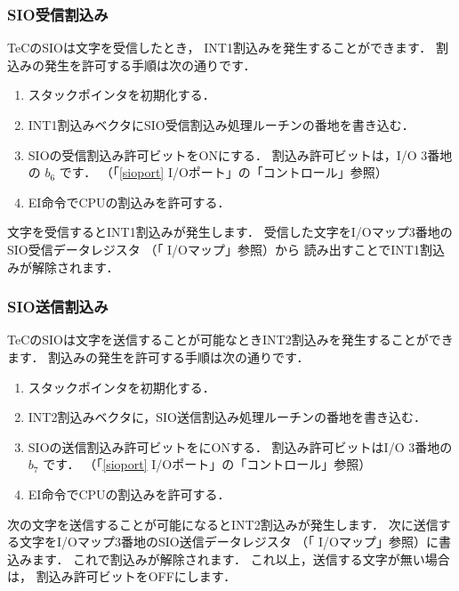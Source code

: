 \subsubsection{SIO受信割込み}
TeCのSIOは文字を受信したとき，
INT1割込みを発生することができます．
割込みの発生を許可する手順は次の通りです．

\begin{enumerate}
\item スタックポインタを初期化する．
\item INT1割込みベクタにSIO受信割込み処理ルーチンの番地を書き込む．
\item SIOの受信割込み許可ビットをONにする．
割込み許可ビットは，I/O 3番地の $b_6$ です．
（「\ref{sioport} I/Oポート」の「コントロール」参照）
\item EI命令でCPUの割込みを許可する．

\end{enumerate}

文字を受信するとINT1割込みが発生します．
受信した文字をI/Oマップ3番地のSIO受信データレジスタ
（「 I/Oマップ」参照）から
読み出すことでINT1割込みが解除されます．


\subsubsection{SIO送信割込み}

TeCのSIOは文字を送信することが可能なときINT2割込みを発生することができます．
割込みの発生を許可する手順は次の通りです．

\begin{enumerate}
\item スタックポインタを初期化する．
\item INT2割込みベクタに，SIO送信割込み処理ルーチンの番地を書き込む．
\item SIOの送信割込み許可ビットをにONする．
割込み許可ビットはI/O 3番地の $b_7$ です．
（「\ref{sioport} I/Oポート」の「コントロール」参照）
\item EI命令でCPUの割込みを許可する．
\end{enumerate}

次の文字を送信することが可能になるとINT2割込みが発生します．
次に送信する文字をI/Oマップ3番地のSIO送信データレジスタ
（「 I/Oマップ」参照）に書込みます．
これで割込みが解除されます．
これ以上，送信する文字が無い場合は，
割込み許可ビットをOFFにします．

